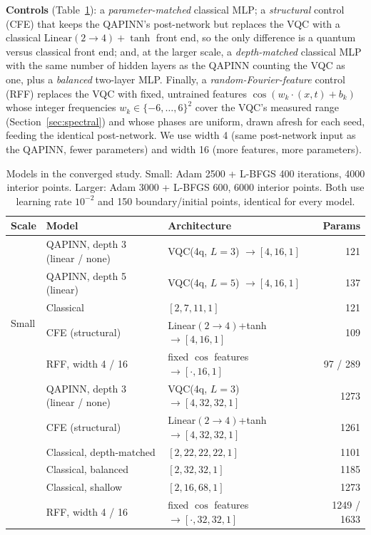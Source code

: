 \documentclass[11pt]{article}
\begin{document}
\textbf{Controls} (Table~\ref{tab:models}): a \emph{parameter-matched} classical MLP;
a \emph{structural} control (CFE) that keeps the QAPINN's post-network but replaces
the VQC with a classical $\mathrm{Linear}(2\to4)+\tanh$ front end, so the only
difference is a quantum versus classical front end; and, at the larger scale, a
\emph{depth-matched} classical MLP with the same number of hidden layers as the
QAPINN counting the VQC as one, plus a \emph{balanced} two-layer MLP. Finally, a
\emph{random-Fourier-feature} control (RFF) replaces the VQC with fixed, untrained
features $\cos(w_k\cdot(x,t)+b_k)$ whose integer frequencies $w_k\in\{-6,\dots,6\}^2$
cover the VQC's measured range (Section~\ref{sec:spectral}) and whose phases are
uniform, drawn afresh for each seed, feeding the identical post-network. We use width 4
(same post-network input as the QAPINN, fewer parameters) and width 16 (more features,
more parameters).

\begin{table}[t]
  \centering\small
  \begin{tabular}{lllr}
    \toprule
    Scale & Model & Architecture & Params \\
    \midrule
    \multirow{6}{*}{Small}
      & QAPINN, depth 3 (linear / none) & VQC(4q, $L{=}3$) $\to[4,16,1]$ & 121 \\
      & QAPINN, depth 5 (linear) & VQC(4q, $L{=}5$) $\to[4,16,1]$ & 137 \\
      & Classical & $[2,7,11,1]$ & 121 \\
      & CFE (structural) & Linear$(2{\to}4)$+tanh $\to[4,16,1]$ & 109 \\
      & RFF, width 4 / 16 & fixed $\cos$ features $\to[\cdot,16,1]$ & 97 / 289 \\
    \midrule
    \multirow{7}{*}{Larger}
      & QAPINN, depth 3 (linear / none) & VQC(4q, $L{=}3$) $\to[4,32,32,1]$ & 1273 \\
      & CFE (structural) & Linear$(2{\to}4)$+tanh $\to[4,32,32,1]$ & 1261 \\
      & Classical, depth-matched & $[2,22,22,22,1]$ & 1101 \\
      & Classical, balanced & $[2,32,32,1]$ & 1185 \\
      & Classical, shallow & $[2,16,68,1]$ & 1273 \\
      & RFF, width 4 / 16 & fixed $\cos$ features $\to[\cdot,32,32,1]$ & 1249 / 1633 \\
    \bottomrule
  \end{tabular}
  \caption{Models in the converged study. Small: Adam 2500 + L-BFGS 400 iterations,
  4000 interior points. Larger: Adam 3000 + L-BFGS 600, 6000 interior points. Both use
  learning rate $10^{-2}$ and 150 boundary/initial points, identical for every model.}
  \label{tab:models}
\end{table}
\end{document}
